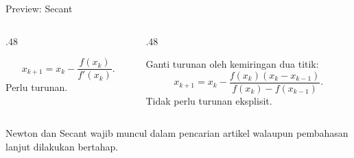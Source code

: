 \documentclass[aspectratio=169,10pt]{beamer}
\begin{document}
\begin{frame}{Preview: Secant}
\small
\begin{columns}[T,totalwidth=\textwidth]
\begin{column}{.48\textwidth}
\begin{bluebox}[Newton]
\[
x_{k+1}=x_k-\frac{f(x_k)}{f'(x_k)}.
\]
Perlu turunan.
\end{bluebox}
\end{column}
\begin{column}{.48\textwidth}
\begin{greenbox}[Secant]
Ganti turunan oleh kemiringan dua titik:
\[
x_{k+1}=x_k-\frac{f(x_k)(x_k-x_{k-1})}{f(x_k)-f(x_{k-1})}.
\]
Tidak perlu turunan eksplisit.
\end{greenbox}
\end{column}
\end{columns}
\begin{orangebox}
Newton dan Secant wajib muncul dalam pencarian artikel walaupun pembahasan lanjut dilakukan bertahap.
\end{orangebox}
\end{frame}
\end{document}
